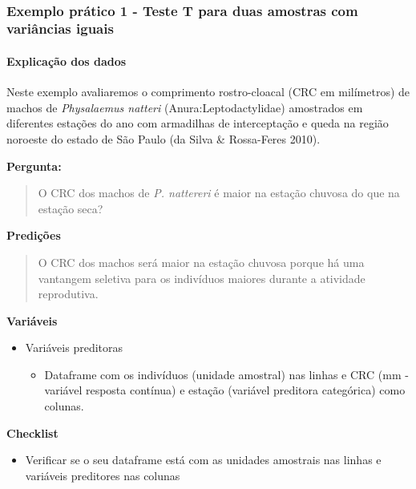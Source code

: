 \documentclass[
]{book}
\providecommand{\tightlist}{%
  \setlength{\itemsep}{0pt}\setlength{\parskip}{0pt}}
\begin{document}
~

\hypertarget{exemplo-pruxe1tico-1---teste-t-para-duas-amostras-com-variuxe2ncias-iguais}{%
\subsubsection{Exemplo prático 1 - Teste T para duas amostras com variâncias iguais}\label{exemplo-pruxe1tico-1---teste-t-para-duas-amostras-com-variuxe2ncias-iguais}}

\hypertarget{explicauxe7uxe3o-dos-dados}{%
\paragraph{Explicação dos dados}\label{explicauxe7uxe3o-dos-dados}}

Neste exemplo avaliaremos o comprimento rostro-cloacal (CRC em milímetros) de machos de \emph{Physalaemus natteri} (Anura:Leptodactylidae) amostrados em diferentes estações do ano com armadilhas de interceptação e queda na região noroeste do estado de São Paulo (da Silva \& Rossa-Feres 2010).

\textbf{Pergunta:}

\begin{quote}
O CRC dos machos de \emph{P. nattereri} é maior na estação chuvosa do que na estação seca?
\end{quote}

\textbf{Predições}

\begin{quote}
O CRC dos machos será maior na estação chuvosa porque há uma vantangem seletiva para os indivíduos maiores durante a atividade reprodutiva.
\end{quote}

\textbf{Variáveis}

\begin{itemize}
\tightlist
\item
  Variáveis preditoras

  \begin{itemize}
  \tightlist
  \item
    Dataframe com os indivíduos (unidade amostral) nas linhas e CRC (mm - variável resposta contínua) e estação (variável preditora categórica) como colunas.
  \end{itemize}
\end{itemize}

\textbf{Checklist}

\begin{itemize}
\tightlist
\item
  Verificar se o seu dataframe está com as unidades amostrais nas linhas e variáveis preditores nas colunas
\end{itemize}
\end{document}
